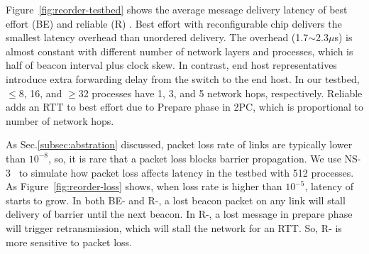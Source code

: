 





Figure~\ref{fig:reorder-testbed} shows the average message delivery latency of best effort (BE) and reliable (R) \sys{}.
Best effort \sys{} with reconfigurable chip delivers the smallest latency overhead than unordered delivery. The overhead (1.7$\sim$2.3$\mu$s) is almost constant with different number of network layers and processes, which is half of beacon interval plus clock skew. In contrast, end host representatives introduce extra forwarding delay from the switch to the end host. In our testbed, $\le$8, 16, and $\ge$32 processes have 1, 3, and 5 network hops, respectively.
Reliable \sys{} adds an RTT to best effort \sys{} due to Prepare phase in 2PC, which is proportional to number of network hops.

As Sec.\ref{subsec:abstration} discussed, packet loss rate of links are typically lower than $10^{-8}$, so, it is rare that a packet loss blocks barrier propagation.
We use NS-3~\cite{henderson2008network} to simulate how packet loss affects latency in the testbed with 512 processes.
As Figure~\ref{fig:reorder-loss} shows, when loss rate is higher than $10^{-5}$, latency of \sys{} starts to grow. In both BE- and R-\sys{}, a lost beacon packet on any link will stall delivery of barrier until the next beacon. In R-\sys{}, a lost message in prepare phase will trigger retransmission, which will stall the network for an RTT. So, R-\sys{} is more sensitive to packet loss.






